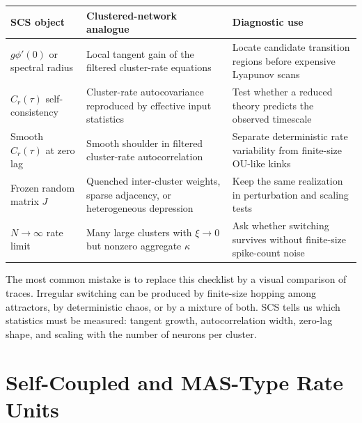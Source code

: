 \begin{keyequation}
\begin{center}
\renewcommand{\arraystretch}{1.35}
\begin{tabularx}{\textwidth}{@{}l X X@{}}
  \toprule
  \textbf{SCS object} & \textbf{Clustered-network analogue} & \textbf{Diagnostic use} \\
  \midrule
  \(g\phi'(0)\) or spectral radius &
  Local tangent gain of the filtered cluster-rate equations &
  Locate candidate transition regions before expensive Lyapunov scans \\
  \(C_r(\tau)\) self-consistency &
  Cluster-rate autocovariance reproduced by effective input statistics &
  Test whether a reduced theory predicts the observed timescale \\
  Smooth \(C_r(\tau)\) at zero lag &
  Smooth shoulder in filtered cluster-rate autocorrelation &
  Separate deterministic rate variability from finite-size OU-like kinks \\
  Frozen random matrix \(J\) &
  Quenched inter-cluster weights, sparse adjacency, or heterogeneous depression &
  Keep the same realization in perturbation and scaling tests \\
  \(N\to\infty\) rate limit &
  Many large clusters with \(\xi\to0\) but nonzero aggregate \(\kappa\) &
  Ask whether switching survives without finite-size spike-count noise \\
  \bottomrule
\end{tabularx}
\end{center}
\end{keyequation}

The most common mistake is to replace this checklist by a visual comparison of
traces. Irregular switching can be produced by finite-size hopping among
attractors, by deterministic chaos, or by a mixture of both. SCS tells us which
statistics must be measured: tangent growth, autocorrelation width, zero-lag
shape, and scaling with the number of neurons per cluster.

\section{Self-Coupled and MAS-Type Rate Units}
\label{sec:ch06-mas-self-coupled}

